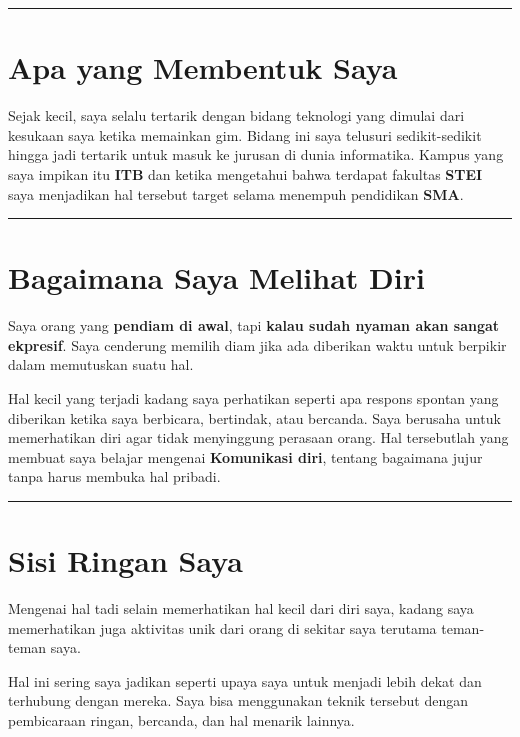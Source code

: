 \documentclass[
  letterpaper,
  DIV=11,
  numbers=noendperiod]{scrreprt}
\begin{document}
\begin{center}\rule{0.5\linewidth}{0.5pt}\end{center}

\section{Apa yang Membentuk Saya}\label{apa-yang-membentuk-saya}

Sejak kecil, saya selalu tertarik dengan bidang teknologi yang dimulai
dari kesukaan saya ketika memainkan gim. Bidang ini saya telusuri
sedikit-sedikit hingga jadi tertarik untuk masuk ke jurusan di dunia
informatika. Kampus yang saya impikan itu \textbf{ITB} dan ketika
mengetahui bahwa terdapat fakultas \textbf{STEI} saya menjadikan hal
tersebut target selama menempuh pendidikan \textbf{SMA}.

\begin{center}\rule{0.5\linewidth}{0.5pt}\end{center}

\section{Bagaimana Saya Melihat Diri}\label{bagaimana-saya-melihat-diri}

Saya orang yang \textbf{pendiam di awal}, tapi \textbf{kalau sudah
nyaman akan sangat ekpresif}. Saya cenderung memilih diam jika ada
diberikan waktu untuk berpikir dalam memutuskan suatu hal.

Hal kecil yang terjadi kadang saya perhatikan seperti apa respons
spontan yang diberikan ketika saya berbicara, bertindak, atau bercanda.
Saya berusaha untuk memerhatikan diri agar tidak menyinggung perasaan
orang. Hal tersebutlah yang membuat saya belajar mengenai
\textbf{Komunikasi diri}, tentang bagaimana jujur tanpa harus membuka
hal pribadi.

\begin{center}\rule{0.5\linewidth}{0.5pt}\end{center}

\section{Sisi Ringan Saya}\label{sisi-ringan-saya}

Mengenai hal tadi selain memerhatikan hal kecil dari diri saya, kadang
saya memerhatikan juga aktivitas unik dari orang di sekitar saya
terutama teman-teman saya.

Hal ini sering saya jadikan seperti upaya saya untuk menjadi lebih dekat
dan terhubung dengan mereka. Saya bisa menggunakan teknik tersebut
dengan pembicaraan ringan, bercanda, dan hal menarik lainnya.
\end{document}
